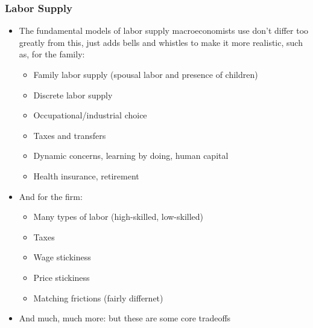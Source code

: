 \documentclass{beamer}
\begin{document}
\begin{frame}
\frametitle[alignment=center]{Labor Supply}
\begin{itemize}
\item The fundamental models of labor supply macroeconomists use don't differ too greatly from this, just adds bells and whistles to make it more realistic, such as, for the family:
\begin{itemize}
\item Family labor supply (spousal labor and presence of children)
\smallskip
\item Discrete labor supply
\smallskip
\item Occupational/industrial choice
\smallskip
\item Taxes and transfers
\smallskip
\item Dynamic concerns, learning by doing, human capital
\smallskip
\item Health insurance, retirement
\end{itemize}
\item And for the firm:
\begin{itemize}
\item Many types of labor (high-skilled, low-skilled)
\smallskip
\item Taxes
\smallskip
\item Wage stickiness
\smallskip
\item Price stickiness
\smallskip
\item Matching frictions (fairly differnet)
\end{itemize}
\item And much, much more: but these are some core tradeoffs
\end{itemize}
\end{frame}
\end{document}
